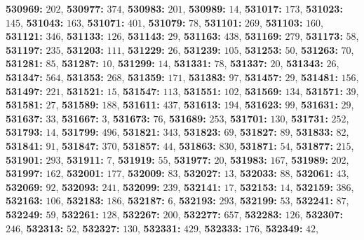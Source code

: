 \textsf{\bfseries 530969:} $202$, \textsf{\bfseries 530977:} $374$, \textsf{\bfseries 530983:} $201$, \textsf{\bfseries 530989:} $14$, \textsf{\bfseries 531017:} $173$, \textsf{\bfseries 531023:} $145$, \textsf{\bfseries 531043:} $163$, \textsf{\bfseries 531071:} $401$, \textsf{\bfseries 531079:} $78$, \textsf{\bfseries 531101:} $269$, \textsf{\bfseries 531103:} $160$, \textsf{\bfseries 531121:} $346$, \textsf{\bfseries 531133:} $126$, \textsf{\bfseries 531143:} $29$, \textsf{\bfseries 531163:} $438$, \textsf{\bfseries 531169:} $279$, \textsf{\bfseries 531173:} $58$, \textsf{\bfseries 531197:} $235$, \textsf{\bfseries 531203:} $111$, \textsf{\bfseries 531229:} $26$, \textsf{\bfseries 531239:} $105$, \textsf{\bfseries 531253:} $50$, \textsf{\bfseries 531263:} $70$, \textsf{\bfseries 531281:} $85$, \textsf{\bfseries 531287:} $10$, \textsf{\bfseries 531299:} $14$, \textsf{\bfseries 531331:} $78$, \textsf{\bfseries 531337:} $20$, \textsf{\bfseries 531343:} $26$, \textsf{\bfseries 531347:} $564$, \textsf{\bfseries 531353:} $268$, \textsf{\bfseries 531359:} $171$, \textsf{\bfseries 531383:} $97$, \textsf{\bfseries 531457:} $29$, \textsf{\bfseries 531481:} $156$, \textsf{\bfseries 531497:} $221$, \textsf{\bfseries 531521:} $15$, \textsf{\bfseries 531547:} $113$, \textsf{\bfseries 531551:} $102$, \textsf{\bfseries 531569:} $134$, \textsf{\bfseries 531571:} $39$, \textsf{\bfseries 531581:} $27$, \textsf{\bfseries 531589:} $188$, \textsf{\bfseries 531611:} $437$, \textsf{\bfseries 531613:} $194$, \textsf{\bfseries 531623:} $99$, \textsf{\bfseries 531631:} $29$, \textsf{\bfseries 531637:} $33$, \textsf{\bfseries 531667:} $3$, \textsf{\bfseries 531673:} $76$, \textsf{\bfseries 531689:} $253$, \textsf{\bfseries 531701:} $130$, \textsf{\bfseries 531731:} $252$, \textsf{\bfseries 531793:} $14$, \textsf{\bfseries 531799:} $496$, \textsf{\bfseries 531821:} $343$, \textsf{\bfseries 531823:} $69$, \textsf{\bfseries 531827:} $89$, \textsf{\bfseries 531833:} $82$, \textsf{\bfseries 531841:} $91$, \textsf{\bfseries 531847:} $370$, \textsf{\bfseries 531857:} $44$, \textsf{\bfseries 531863:} $830$, \textsf{\bfseries 531871:} $54$, \textsf{\bfseries 531877:} $215$, \textsf{\bfseries 531901:} $293$, \textsf{\bfseries 531911:} $7$, \textsf{\bfseries 531919:} $55$, \textsf{\bfseries 531977:} $20$, \textsf{\bfseries 531983:} $167$, \textsf{\bfseries 531989:} $202$, \textsf{\bfseries 531997:} $162$, \textsf{\bfseries 532001:} $177$, \textsf{\bfseries 532009:} $83$, \textsf{\bfseries 532027:} $13$, \textsf{\bfseries 532033:} $88$, \textsf{\bfseries 532061:} $43$, \textsf{\bfseries 532069:} $92$, \textsf{\bfseries 532093:} $241$, \textsf{\bfseries 532099:} $239$, \textsf{\bfseries 532141:} $17$, \textsf{\bfseries 532153:} $14$, \textsf{\bfseries 532159:} $386$, \textsf{\bfseries 532163:} $106$, \textsf{\bfseries 532183:} $186$, \textsf{\bfseries 532187:} $6$, \textsf{\bfseries 532193:} $293$, \textsf{\bfseries 532199:} $53$, \textsf{\bfseries 532241:} $87$, \textsf{\bfseries 532249:} $59$, \textsf{\bfseries 532261:} $128$, \textsf{\bfseries 532267:} $200$, \textsf{\bfseries 532277:} $657$, \textsf{\bfseries 532283:} $126$, \textsf{\bfseries 532307:} $246$, \textsf{\bfseries 532313:} $52$, \textsf{\bfseries 532327:} $130$, \textsf{\bfseries 532331:} $429$, \textsf{\bfseries 532333:} $176$, \textsf{\bfseries 532349:} $42$, 
